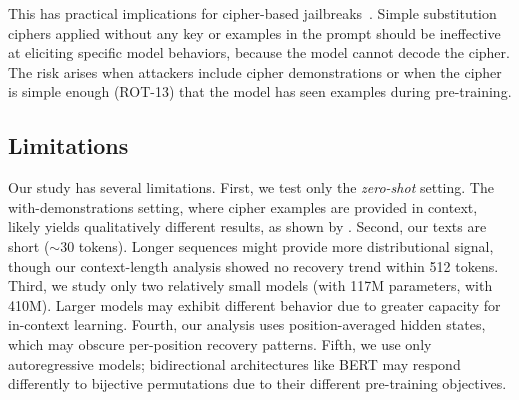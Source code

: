 This has practical implications for cipher-based jailbreaks~\citep{yuan2023gpt4cipher}. Simple substitution ciphers applied without any key or examples in the prompt should be ineffective at eliciting specific model behaviors, because the model cannot decode the cipher. The risk arises when attackers include cipher demonstrations or when the cipher is simple enough (\eg ROT-13) that the model has seen examples during pre-training.

\subsection{Limitations}
\label{sec:limitations}

Our study has several limitations. First, we test only the \emph{zero-shot} setting. The with-demonstrations setting, where cipher examples are provided in context, likely yields qualitatively different results, as shown by \citet{fang2025iclciphers}. Second, our texts are short ($\sim$30 tokens). Longer sequences might provide more distributional signal, though our context-length analysis showed no recovery trend within 512 tokens. Third, we study only two relatively small models (\gpttwo with 117M parameters, \pythia with 410M). Larger models may exhibit different behavior due to greater capacity for in-context learning. Fourth, our analysis uses position-averaged hidden states, which may obscure per-position recovery patterns. Fifth, we use only autoregressive models; bidirectional architectures like BERT may respond differently to bijective permutations due to their different pre-training objectives.
